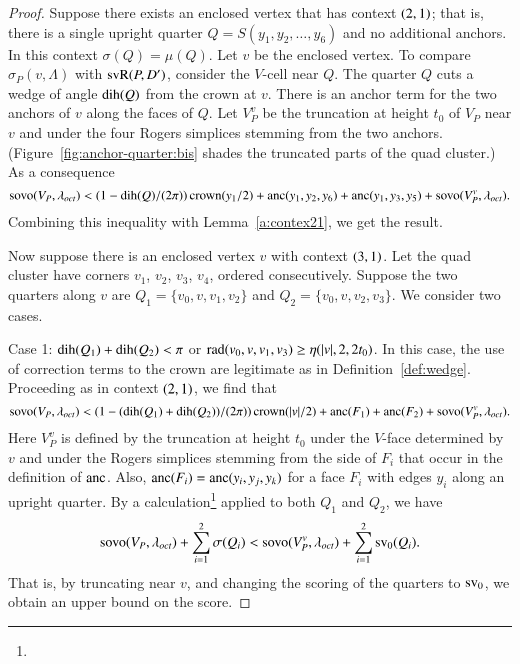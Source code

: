 \begin{proof}
%
Suppose there exists an enclosed vertex that has context
$\relax(2,1)$; that is, there is a single upright quarter
$Q=S(y_1,y_2,\ldots,y_6)$ and no additional anchors.  In this
context $\sigma(Q)=\mu(Q)$. Let $v$ be the enclosed vertex.  To
compare $\sigma_P(v,\Lambda)$ with ${\operatorname{svR}}(P,D')$, consider the $V$-cell
near $Q$. The quarter $Q$ cuts a wedge of angle $\operatorname{dih}(Q)$ from the
crown at $v$. There is an anchor term for the two anchors of $v$
along the faces of $Q$. Let $V_P^v$ be the truncation at height
$t_0$ of $V_P$ near $v$ and under the four Rogers simplices
stemming from the two anchors.
(Figure~\ref{fig:anchor-quarter:bis} shades the truncated parts of
the quad cluster.) As a consequence
\smallskip
    \begin{equation}
        {\operatorname{sovo}}(V_P,\lambda_{oct}) <(1-\operatorname{dih}(Q)/(2\pi))\operatorname{crown}(y_1/2)+\operatorname{anc}(y_1,y_2,y_6)
        +\operatorname{anc}(y_1,y_3,y_5) +{\operatorname{sovo}}(V_P^v,\lambda_{oct}).
    \label{eqn:4.8}
    \end{equation}
Combining this inequality with Lemma~\ref{a:contex21}, we get the
result.

Now suppose there is an enclosed vertex $v$ with context
$\relax(3,1)$. Let the quad cluster have corners $v_1$, $v_2$, $v_3$,
$v_4$, ordered consecutively.  Suppose the two quarters along $v$
are $Q_1=\{v_0,v,v_1,v_2\}$ and $Q_2=\{v_0,v,v_2,v_3\}$.  We consider
two cases.

\noindent Case 1:  $\operatorname{dih}(Q_1)+\operatorname{dih}(Q_2)<\pi$ or
$\operatorname{rad}(v_0,v,v_1,v_3)\ge\eta(|v|,2,2t_0)$. In this case, the use of
correction terms to the crown are legitimate as in
Definition~\ref{def:wedge}. Proceeding as in context $\relax(2,1)$, we
find that
\smallskip
    \begin{equation}
    {\operatorname{sovo}}(V_P,\lambda_{oct}) < (1-(\operatorname{dih}(Q_1)+\operatorname{dih}(Q_2))/(2\pi))\operatorname{crown}(|v|/2)
    +\operatorname{anc}(F_1) +\operatorname{anc}(F_2) +{\operatorname{sovo}}(V_P^v,\lambda_{oct}).
    \label{eqn:4.10}
    \end{equation}
Here $V_P^v$ is defined by the truncation at height $t_0$ under the
$V$-face determined by $v$ and under the Rogers simplices stemming
from the side of $F_i$ that occur in the definition of $\operatorname{anc}$. Also,
$\operatorname{anc}(F_i)=\operatorname{anc}(y_i,y_j,y_k)$ for a face $F_i$ with edges $y_i$
along an upright quarter. By a
calculation\footnote{} applied to both $Q_1$ and
$Q_2$, we have
    \begin{equation}
    {\operatorname{sovo}}(V_P,\lambda_{oct}) +\sum_{i=1}^2\sigma(Q_i)
    < {\operatorname{sovo}}(V_P^v,\lambda_{oct}) + \sum_{i=1}^2 {\operatorname{sv}}_0(Q_i).
    \label{eqn:4.11}
    \end{equation}
That is, by truncating near $v$, and changing the scoring of the
quarters to ${\operatorname{sv}}_0$, we obtain an upper bound on the score.


\end{proof}
